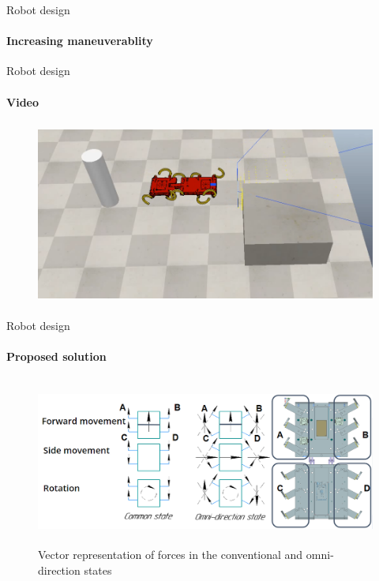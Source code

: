 \documentclass[aspectratio=169,xcolor=table]{beamer}
\begin{document}
\begin{frame}[t]{Robot design}
    \framesubtitle{Increasing maneuverablity}
\end{frame}

\begin{frame}[t]{Robot design}
    \framesubtitle{Video}
    \vspace{-0.6cm}
    \begin{figure}[H]
        \href{https://youtu.be/EQ6oGZVDpoc}{
            \centering\includegraphics[height=6cm,width=1\textwidth,keepaspectratio]{sidestep_segment_video_preview.png}}
    \end{figure}
\end{frame}

\begin{frame}[t]{Robot design}
    \framesubtitle{Proposed solution}
    \vspace{-0.8cm}
    \begin{figure}[H]
        \centering\includegraphics[height=5.5cm,width=1\textwidth,keepaspectratio]{omni_rot.png}
        \caption*{Vector representation of forces in  the conventional and omni-direction states}
    \end{figure}
\end{frame}
\end{document}
